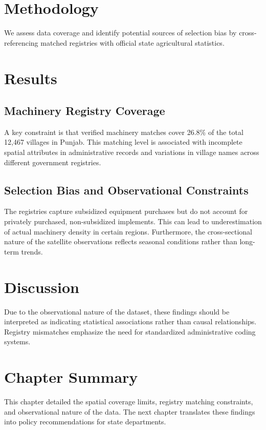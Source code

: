 \documentclass[12pt,a4paper]{report}
\begin{document}
\section{Methodology}
We assess data coverage and identify potential sources of selection bias by cross-referencing matched registries with official state agricultural statistics.

\section{Results}
\subsection{Machinery Registry Coverage}
A key constraint is that verified machinery matches cover 26.8\% of the total 12,467 villages in Punjab. This matching level is associated with incomplete spatial attributes in administrative records and variations in village names across different government registries.

\subsection{Selection Bias and Observational Constraints}
The registries capture subsidized equipment purchases but do not account for privately purchased, non-subsidized implements. This can lead to underestimation of actual machinery density in certain regions. Furthermore, the cross-sectional nature of the satellite observations reflects seasonal conditions rather than long-term trends.

\section{Discussion}
Due to the observational nature of the dataset, these findings should be interpreted as indicating statistical associations rather than causal relationships. Registry mismatches emphasize the need for standardized administrative coding systems.

\section{Chapter Summary}
This chapter detailed the spatial coverage limits, registry matching constraints, and observational nature of the data. The next chapter translates these findings into policy recommendations for state departments.

\end{document}

